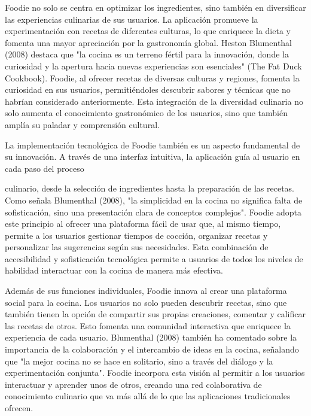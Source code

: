 \documentclass[a4paper,12pt]{article}
\begin{document}
Foodie no solo se centra en optimizar los ingredientes, sino también en diversificar las experiencias culinarias de sus usuarios. La aplicación promueve la experimentación con recetas de diferentes culturas, lo que enriquece la dieta y fomenta una mayor apreciación por la gastronomía global. Heston Blumenthal (2008) destaca que "la cocina es un terreno fértil para la innovación, donde la curiosidad y la apertura hacia nuevas experiencias son esenciales" (The Fat Duck Cookbook). Foodie, al ofrecer recetas de diversas culturas y regiones, fomenta la curiosidad en sus usuarios, permitiéndoles descubrir sabores y técnicas que no habrían considerado anteriormente. Esta integración de la diversidad culinaria no solo aumenta el conocimiento gastronómico de los usuarios, sino que también amplía su paladar y comprensión cultural.

La implementación tecnológica de Foodie también es un aspecto fundamental de su innovación. A través de una interfaz intuitiva, la aplicación guía al usuario en cada paso del proceso
 
culinario, desde la selección de ingredientes hasta la preparación de las recetas. Como señala Blumenthal (2008), "la simplicidad en la cocina no significa falta de sofisticación, sino una presentación clara de conceptos complejos". Foodie adopta este principio al ofrecer una plataforma fácil de usar que, al mismo tiempo, permite a los usuarios gestionar tiempos de cocción, organizar recetas y personalizar las sugerencias según sus necesidades. Esta combinación de accesibilidad y sofisticación tecnológica permite a usuarios de todos los niveles de habilidad interactuar con la cocina de manera más efectiva.

Además de sus funciones individuales, Foodie innova al crear una plataforma social para la cocina. Los usuarios no solo pueden descubrir recetas, sino que también tienen la opción de compartir sus propias creaciones, comentar y calificar las recetas de otros. Esto fomenta una comunidad interactiva que enriquece la experiencia de cada usuario. Blumenthal (2008) también ha comentado sobre la importancia de la colaboración y el intercambio de ideas en la cocina, señalando que "la mejor cocina no se hace en solitario, sino a través del diálogo y la experimentación conjunta". Foodie incorpora esta visión al permitir a los usuarios interactuar y aprender unos de otros, creando una red colaborativa de conocimiento culinario que va más allá de lo que las aplicaciones tradicionales ofrecen.
\end{document}
